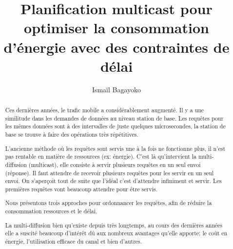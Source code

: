 \documentclass[runningheads]{llncs}
\begin{document}
%
\title{Planification multicast pour optimiser la consommation 
d'\'energie avec des contraintes de d\'elai}
%
%
\author{Isma\"il Bagayoko}
%
%
%
\maketitle              %
%
\begin{abstract}
Ces dernières années, le trafic mobile a considérablement augmenté. 
Il y a une similitude dans les demandes de données au niveau station 
de base. Les requêtes pour les mêmes données sont à des intervalles 
de juste quelques microsecondes, la station de base se trouve à faire des 
opérations très répétitives. 

L'ancienne méthode où les requêtes sont servis une à la fois ne 
fonctionne plus, il n'est pas rentable en matière de ressources 
(ex: énergie). C'est là qu'intervient la multi-diffusion (multicast), 
elle consiste à servir plusieurs requêtes en un seul envoi (réponse).
Il faut attendre de recevoir  plusieurs requêtes pour les servir en 
un seul envoi. On s'aperçoit tout de suite que l'idéal c'est d'attendre 
infiniment et servir. Les premières requêtes vont beaucoup attendre pour 
être servis.

Nous présentons trois approches pour ordonnancer les requêtes, afin de 
réduire la consommation ressources et le délai.


La multi-diffusion bien qu'existe depuis très longtemps, au cours des 
dernières années elle a suscité beaucoup d'intérêt dû aux nombreux 
avantages qu'elle apporte: le coût en énergie, l'utilisation efficace 
du canal et bien d'autres.


\end{abstract}
%
%
%
\end{document}

